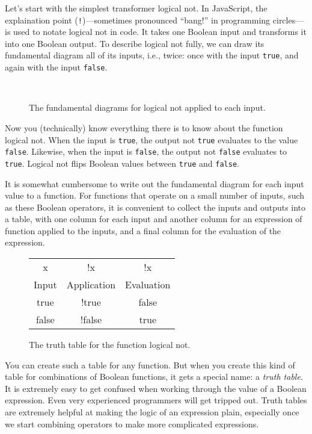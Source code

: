 Let's start with the simplest transformer logical \textsf{not}. In JavaScript, the explaination point (\texttt{!})---sometimes pronounced ``bang!'' in programming circles---is used to notate logical \textsf{not} in code. It takes one \textsf{Boolean} input and transforms it into one \textsf{Boolean} output. To describe logical \textsf{not} fully, we can draw its fundamental diagram all of its inputs, i.e., twice: once with the input \texttt{true}, and again with the input \texttt{false}.

\begin{figure}
  \\
  
  \caption{\label{conds:not-fundamental-diagram.tex}The fundamental diagrams for logical \textsf{not} applied to each input.}
\end{figure}

Now you (technically) know everything there is to know about the function logical \textsf{not}. When the input is \texttt{true}, the output \textsf{not} \texttt{true} evaluates to the value \texttt{false}. Likewise, when the input is \texttt{false}, the output \textsf{not} \texttt{false} evaluates to \texttt{true}. Logical \textsf{not} flips Boolean values between \texttt{true} and \texttt{false}.

It is somewhat cumbersome to write out the fundamental diagram for each input value to a function. For functions that operate on a small number of inputs, such as these \textsf{Boolean} operators, it is convenient to collect the inputs and outputs into a table, with one column for each input and another column for an expression of function applied to the inputs, and a final column for the evaluation of the expression.

\begin{figure}[h]
  \ttfamily
  \small
  \color{cyan}
  \begin{tabular}{c  c  c}
    x & !x & !x\\
    \textsf{Input} & \textsf{Application} & \textsf{Evaluation}\\
    \hline
    true & !true & false\\
    false & !false & true
  \end{tabular}
  \caption{\label{fig:conditionals-logical-not} The truth table for the function logical \textsf{not}.}
\end{figure}

You can create such a table for any function. But when you create this kind of table for combinations of \textsf{Boolean} functions, it gets a special name: a \emph{truth table}. It is extremely easy to get confused when working through the value of a \textsf{Boolean} expression. Even very experienced programmers will get tripped out. Truth tables are extremely helpful at making the logic of an expression plain, especially once we start combining operators to make more complicated expressions.

